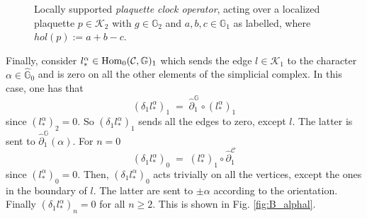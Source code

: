 \documentclass[a4paper,12pt,twoside,reqno]{amsart}
\theoremstyle{plain}
\theoremstyle{definition}
\theoremstyle{remark}
\numberwithin{equation}{section}
\numberwithin{figure}{section}
\numberwithin{table}{section}
\newcommand{\f}[1]{\mathcal{#1}}
\newcommand{\n}[1]{\mathbb{#1}}
\begin{document}
\begin{figure}[H]
		\caption{\label{fig:B_gammap} Locally supported \textit{plaquette clock operator}, acting over a localized plaquette $p\in \f{K}_2$ with $g\in\n{G}_2$ and $a,b,c\in\n{G}_1$ as labelled, where $hol(p):= a+b-c$. }
	\end{figure}
	
	
	
	
	
	Finally, consider $l^\alpha_*\in {\rm Hom}_0(\f{C},\n{G})_1$
	which sends the edge $l\in \f{K}_1$ to the character $\alpha\in\widehat{\n{G}}_0$ and is zero on 
	all the other elements of the simplicial complex.
	In this case, one has that
	\begin{equation*}
		(\delta_1l^\alpha_*)_1\;=\;\widehat{\partial}^\n{G}_1\circ (l^\alpha_*)_1
	\end{equation*}
	since $(l^\alpha_*)_2=0$.
	So $(\delta_1l^\alpha_*)_1$ sends all the edges to zero, except  $l$. The latter is sent to $\widehat{\partial}^\n{G}_1(\alpha)$. For
	$n=0$
	\begin{equation*}
		(\delta_1l^\alpha_*)_0\;=\;(l^\alpha_*)_1\circ \widehat{\partial}^\f{C}_1
	\end{equation*}
	since $(l^\alpha_*)_0=0$. Then, $(\delta_1l^\alpha_*)_0$
	acts trivially on all the vertices, except the ones in the boundary of $l$. The latter are sent to $\pm \alpha$ according to the orientation.
	Finally $(\delta_1l^\alpha_*)_n=0$ for all $n\geqslant2$.
	This is shown in Fig. \ref{fig:B_alphal}.
	
	
	
\end{document}
